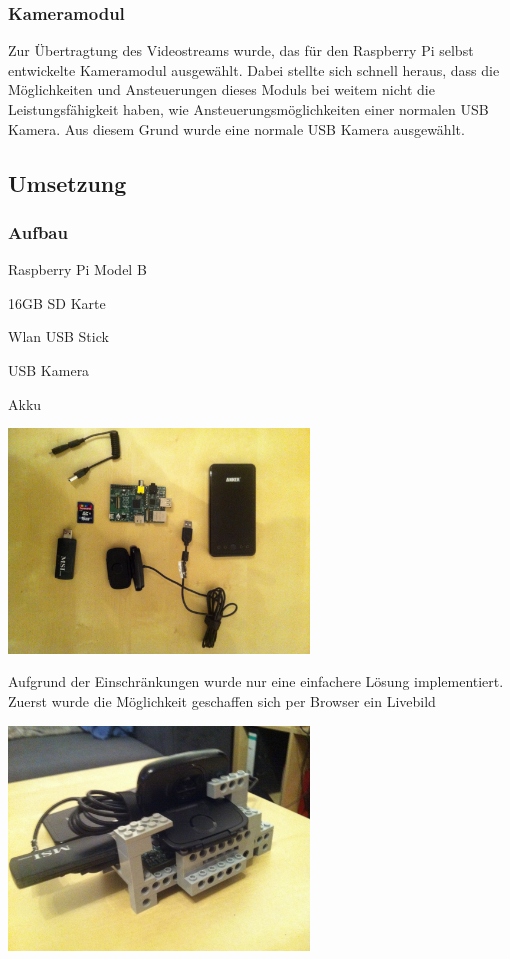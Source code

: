 \subsubsection{Kameramodul}

Zur Übertragtung des Videostreams wurde, das für den Raspberry Pi selbst entwickelte Kameramodul ausgewählt. Dabei stellte sich schnell heraus, dass die Möglichkeiten und Ansteuerungen dieses Moduls bei weitem nicht die Leistungsfähigkeit haben, wie Ansteuerungsmöglichkeiten einer normalen USB Kamera. Aus diesem Grund wurde eine normale USB Kamera ausgewählt.

\subsection{Umsetzung}

\subsubsection{Aufbau}
\begin{capitemize}[Komponenten]
	\item Raspberry Pi Model B
	\item 16GB SD Karte
	\item Wlan USB Stick
	\item USB Kamera
	\item Akku
\end{capitemize}

\begin{capfigure}[Komponenten]
	\includegraphics[width=8cm]{images/raspi/aufbau}
\end{capfigure}


Aufgrund der Einschränkungen wurde nur eine einfachere Lösung implementiert. Zuerst wurde die Möglichkeit geschaffen sich per Browser ein Livebild

\begin{capfigure}[Komponenten]
	\includegraphics[width=8cm]{images/raspi/konstruktion}
\end{capfigure}

